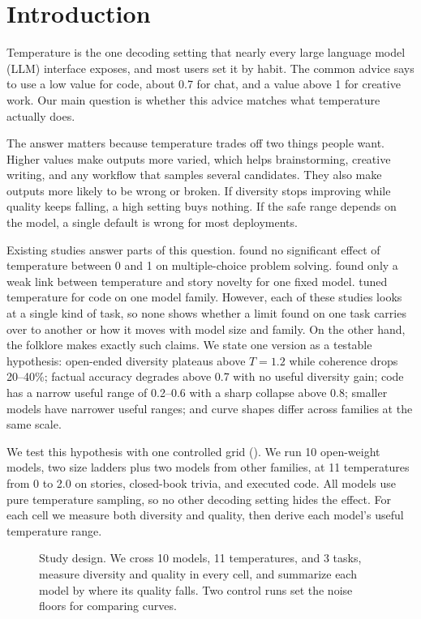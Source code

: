 \section{Introduction}
\label{sec:intro}

Temperature is the one decoding setting that nearly every large language model (LLM) interface exposes, and most users set it by habit. The common advice says to use a low value for code, about 0.7 for chat, and a value above 1 for creative work. Our main question is whether this advice matches what temperature actually does.

The answer matters because temperature trades off two things people want. Higher values make outputs more varied, which helps brainstorming, creative writing, and any workflow that samples several candidates. They also make outputs more likely to be wrong or broken. If diversity stops improving while quality keeps falling, a high setting buys nothing. If the safe range depends on the model, a single default is wrong for most deployments.

Existing studies answer parts of this question. \citet{renze2024temperature} found no significant effect of temperature between 0 and 1 on multiple-choice problem solving. \citet{peeperkorn2024temperature} found only a weak link between temperature and story novelty for one fixed model. \citet{chen2021codex} tuned temperature for code on one model family. However, each of these studies looks at a single kind of task, so none shows whether a limit found on one task carries over to another or how it moves with model size and family. On the other hand, the folklore makes exactly such claims. We state one version as a testable hypothesis: open-ended diversity plateaus above $T = 1.2$ while coherence drops 20--40\%; factual accuracy degrades above 0.7 with no useful diversity gain; code has a narrow useful range of 0.2--0.6 with a sharp collapse above 0.8; smaller models have narrower useful ranges; and curve shapes differ across families at the same scale.

We test this hypothesis with one controlled grid (). We run 10 open-weight models, two size ladders plus two models from other families, at 11 temperatures from 0 to 2.0 on stories, closed-book trivia, and executed code. All models use pure temperature sampling, so no other decoding setting hides the effect. For each cell we measure both diversity and quality, then derive each model's useful temperature range.

\begin{figure}[t]
    \centering
    \resizebox{0.95\linewidth}{!}{}
    \caption{Study design. We cross 10 models, 11 temperatures, and 3 tasks, measure diversity and quality in every cell, and summarize each model by where its quality falls. Two control runs set the noise floors for comparing curves.}
    \label{fig:overview}
\end{figure}

